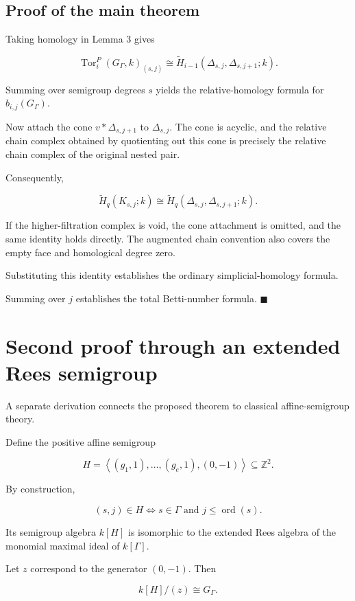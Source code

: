 \documentclass[11pt]{article}
\begin{document}
\subsection{Proof of the main theorem}

Taking homology in Lemma 3 gives

\[
\operatorname{Tor}^{P}_i(G_\Gamma,k)_{(s,j)}
\cong
\widetilde H_{i-1}
(\Delta_{s,j},\Delta_{s,j+1};k).
\]

Summing over semigroup degrees \(s\) yields the relative-homology formula for \(b_{i,j}(G_\Gamma)\).

Now attach the cone \(v*\Delta_{s,j+1}\) to \(\Delta_{s,j}\). The cone is acyclic, and the relative chain complex obtained by quotienting out this cone is precisely the relative chain complex of the original nested pair.

Consequently,

\[
\widetilde H_q(K_{s,j};k)
\cong
\widetilde H_q
(\Delta_{s,j},\Delta_{s,j+1};k).
\]

If the higher-filtration complex is void, the cone attachment is omitted, and the same identity holds directly. The augmented chain convention also covers the empty face and homological degree zero.

Substituting this identity establishes the ordinary simplicial-homology formula.

Summing over \(j\) establishes the total Betti-number formula. \(\blacksquare\)

\section{Second proof through an extended Rees semigroup}

A separate derivation connects the proposed theorem to classical affine-semigroup theory.

Define the positive affine semigroup

\[
H=
\left\langle
(g_1,1),\ldots,(g_e,1),(0,-1)
\right\rangle
\subseteq\mathbb Z^2.
\]

By construction,

\[
(s,j)\in H
\iff
s\in\Gamma
\text{ and }
j\le\operatorname{ord}(s).
\]

Its semigroup algebra \(k[H]\) is isomorphic to the extended Rees algebra of the monomial maximal ideal of \(k[\Gamma]\).

Let \(z\) correspond to the generator \((0,-1)\). Then

\[
k[H]/(z)\cong G_\Gamma.
\]
\end{document}
